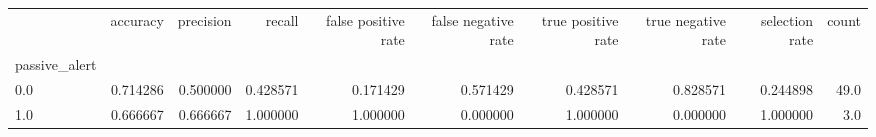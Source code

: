 \begin{tabular}{lrrrrrrrrr}
\toprule
{} &  accuracy &  precision &    recall &  false positive rate &  false negative rate &  true positive rate &  true negative rate &  selection rate &  count \\
passive\_alert &           &            &           &                      &                      &                     &                     &                 &        \\
\midrule
0.0           &  0.714286 &   0.500000 &  0.428571 &             0.171429 &             0.571429 &            0.428571 &            0.828571 &        0.244898 &   49.0 \\
1.0           &  0.666667 &   0.666667 &  1.000000 &             1.000000 &             0.000000 &            1.000000 &            0.000000 &        1.000000 &    3.0 \\
\bottomrule
\end{tabular}
